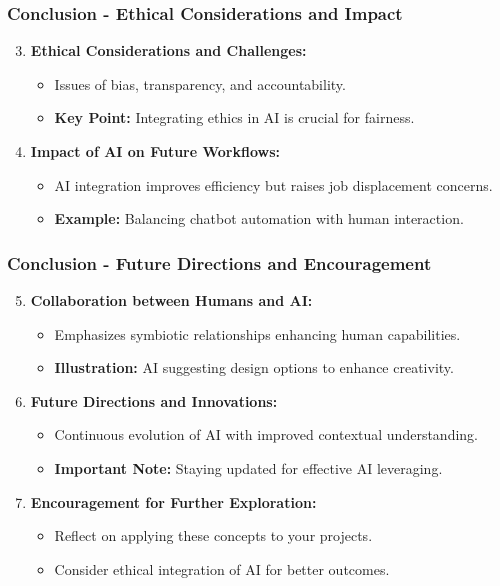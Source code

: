 \documentclass[aspectratio=169]{beamer}
\begin{document}
\begin{frame}[fragile]
    \frametitle{Conclusion - Ethical Considerations and Impact}
    \begin{enumerate}
        \setcounter{enumi}{2} %
        \item \textbf{Ethical Considerations and Challenges:}
        \begin{itemize}
            \item Issues of bias, transparency, and accountability.
            \item \textbf{Key Point:} Integrating ethics in AI is crucial for fairness.
        \end{itemize}
        
        \item \textbf{Impact of AI on Future Workflows:}
        \begin{itemize}
            \item AI integration improves efficiency but raises job displacement concerns.
            \item \textbf{Example:} Balancing chatbot automation with human interaction.
        \end{itemize}
    \end{enumerate}
\end{frame}

\begin{frame}[fragile]
    \frametitle{Conclusion - Future Directions and Encouragement}
    \begin{enumerate}
        \setcounter{enumi}{4} %
        \item \textbf{Collaboration between Humans and AI:}
        \begin{itemize}
            \item Emphasizes symbiotic relationships enhancing human capabilities.
            \item \textbf{Illustration:} AI suggesting design options to enhance creativity.
        \end{itemize}
        
        \item \textbf{Future Directions and Innovations:}
        \begin{itemize}
            \item Continuous evolution of AI with improved contextual understanding.
            \item \textbf{Important Note:} Staying updated for effective AI leveraging.
        \end{itemize}
        
        \item \textbf{Encouragement for Further Exploration:}
        \begin{itemize}
            \item Reflect on applying these concepts to your projects.
            \item Consider ethical integration of AI for better outcomes.
        \end{itemize}
    \end{enumerate}
\end{frame}
\end{document}

